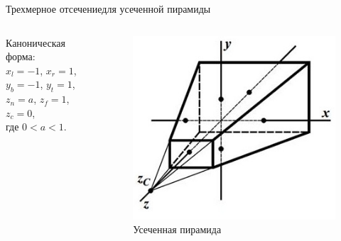 \documentclass{beamer}
\begin{document}
	\begin{frame}{Трехмерное отсечение}{для усеченной пирамиды}

		\begin{columns}
			\begin{column}{0.5\textwidth}

			Каноническая форма: \\
			$x_l = -1$, $x_r = 1$, \\
			$y_b = -1$, $y_t = 1$, \\
			$z_n = a$, $z_f = 1$, \\
			$z_c = 0$,
			\\ где  $0<a<1$.
			\end{column}
			\begin{column}{0.5\textwidth}
		\begin{figure} 
			\includegraphics[width=\textwidth]{images/clipping_2.jpg}
			\caption {Усеченная пирамида}
		\end{figure}

		\end{column}
	\end{columns}

	\end{frame}
	
\end{document}
